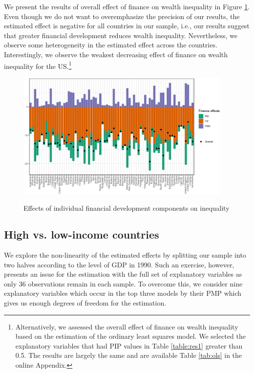 \documentclass[a4paper,11pt]{article}
\begin{document}
We present the results of overall effect of finance on wealth inequality in Figure \ref{fig:finance_effect}. Even though we do not want to overemphasize the precision of our results, the estimated effect is negative for all countries in our sample, i.e., our results suggest that greater financial development reduces wealth inequality. Nevertheless, we observe some heterogeneity in the estimated effect across the countries. Interestingly, we observe the weakest decreasing effect of finance on wealth inequality for the \ac{US}.\footnote{Alternatively, we assessed the overall effect of finance on wealth inequality based on the estimation of the ordinary least squares model. We selected the explanatory variables that had PIP values in Table \ref{table:res1} greater than 0.5. The results are largely the same and are available Table \ref{tab:ols} in the online Appendix.}

\begin{figure}
\begin{center}
\caption{Effects of individual financial development components on inequality}
\includegraphics[width=0.95\textwidth]{figures/finance_effect.eps}
\label{fig:finance_effect}
\end{center}
\end{figure}

\subsection{High vs. low-income countries}
We explore the non-linearity of the estimated effects by splitting our sample into two halves according to the level of GDP in 1990. Such an exercise, however, presents an issue for the estimation with the full set of explanatory variables as only 36 observations remain in each sample. To overcome this, we consider nine explanatory variables which occur in the top three models by their \ac{PMP} which gives us enough degrees of freedom for the estimation. 
\end{document}
